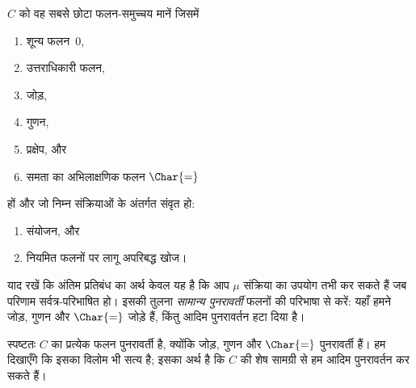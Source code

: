 \documentclass[../../../include/open-logic-section]{subfiles}
\begin{document}

$C$ को वह सबसे छोटा फलन-समुच्चय मानें जिसमें
\begin{enumerate}
\item शून्य फलन~$0$,
\item उत्तराधिकारी फलन,
\item जोड़,
\item गुणन,
\item प्रक्षेप, और
\item समता का अभिलाक्षणिक फलन $\Char{=}$
\end{enumerate}
हों और जो निम्न संक्रियाओं के अंतर्गत संवृत हो:
\begin{enumerate}
\item संयोजन, और
\item नियमित फलनों पर लागू अपरिबद्ध खोज।
\end{enumerate}
याद रखें कि अंतिम प्रतिबंध का अर्थ केवल यह है कि आप $\mu$ संक्रिया का
उपयोग तभी कर सकते हैं जब परिणाम सर्वत्र-परिभाषित हो। इसकी तुलना
\emph{सामान्य पुनरावर्ती} फलनों की परिभाषा से करें: यहाँ हमने जोड़, गुणन और
$\Char{=}$ जोड़े हैं, किंतु आदिम पुनरावर्तन हटा दिया है।

स्पष्टतः $C$ का प्रत्येक फलन पुनरावर्ती है, क्योंकि जोड़, गुणन और
$\Char{=}$ पुनरावर्ती हैं। हम दिखाएँगे कि इसका विलोम भी सत्य है; इसका अर्थ
है कि $C$ की शेष सामग्री से हम आदिम पुनरावर्तन कर सकते हैं।
\end{document}
